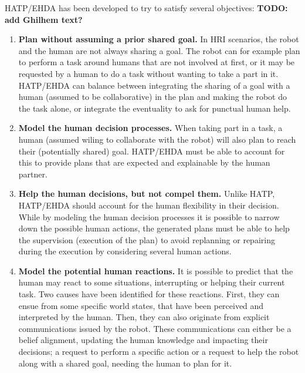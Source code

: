 HATP/EHDA has been developed to try to satisfy several objectives: \textbf{TODO: add Ghilhem text?}

\begin{enumerate}
    \item \textbf{Plan without assuming a prior shared goal.} In HRI scenarios, the robot and the human are not always sharing a goal. The robot can for example plan to perform a task around humans that are not involved at first, or it may be requested by a human to do a task without wanting to take a part in it. HATP/EHDA can balance between integrating the sharing of a goal with a human (assumed to be collaborative) in the plan and making the robot do the task alone, or integrate the eventuality to ask for punctual human help. 

    \item \textbf{Model the human decision processes.} When taking part in a task, a human (assumed wiling to collaborate with the robot) will also plan to reach their (potentially shared) goal. HATP/EHDA must be able to account for this to provide plans that are expected and explainable by the human partner.

    \item \textbf{Help the human decisions, but not compel them.} Unlike HATP, HATP/EHDA should account for the human flexibility in their decision. While by modeling the human decision processes it is possible to narrow down the possible human actions, the generated plans must be able to help the supervision (execution of the plan) to avoid replanning or repairing during the execution by considering several human actions.

    \item \textbf{Model the potential human reactions.} It is possible to predict that the human may react to some situations, interrupting or helping their current task. Two causes have been identified for these reactions. First, they can ensue from some specific world states, that have been perceived and interpreted by the human. Then, they can also originate from explicit communications issued by the robot. These communications can either be a belief alignment, updating the human knowledge and impacting their decisions; a request to perform a specific action or a request to help the robot along with a shared goal, needing the human to plan for it.


\end{enumerate}

